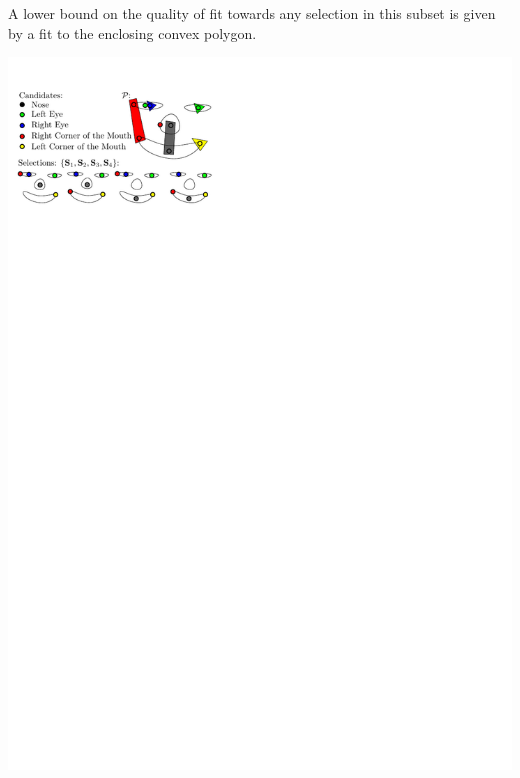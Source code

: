 \documentclass[landscape,final,a0paper,fontscale=0.27065]{baposter}
\begin{document}
\begin{poster}
{  A lower bound on the quality of fit towards any selection in this subset is
  given by a fit to the enclosing convex polygon.
  \vspace{1.0em}
  \begin{center}
    \includegraphics[width=\linewidth]{images/representation.pdf}
  \end{center}
  }
\end{poster}
\end{document}
